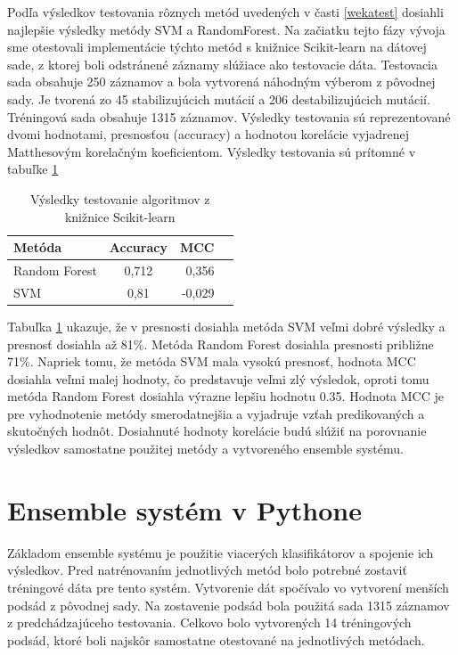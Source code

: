 Podľa výsledkov testovania rôznych metód uvedených v časti \ref{wekatest} dosiahli najlepšie výsledky metódy SVM a RandomForest. Na začiatku tejto fázy vývoja sme otestovali implementácie týchto metód s knižnice Scikit-learn na dátovej sade, z ktorej boli odstránené záznamy slúžiace ako testovacie dáta. Testovacia sada obsahuje 250 záznamov a bola vytvorená náhodným výberom z pôvodnej sady. Je tvorená zo 45 stabilizujúcich mutácií a 206 destabilizujúcich mutácií. Tréningová sada obsahuje 1315 záznamov. Výsledky testovania sú reprezentované dvomi hodnotami, presnosťou (accuracy) a hodnotou korelácie vyjadrenej Matthesovým korelačným koeficientom. Výsledky testovania sú prítomné v tabuľke \ref{scikittest}
\begin{table}[H]
	\centering
	\begin{tabular}{ | l | c | r | l| }
		\hline 
		Metóda  & Accuracy & MCC \\ \hline
		Random Forest & 0,712 & 0,356\\ \hline
		SVM & 0,81 & -0,029 \\\hline
	\end{tabular}
	\caption {Výsledky testovanie algoritmov z knižnice Scikit-learn} \label{scikittest} 
\end{table}

Tabuľka \ref{scikittest} ukazuje, že v presnosti dosiahla metóda SVM veľmi dobré výsledky a presnosť dosiahla až 81\%. Metóda Random Forest dosiahla presnosti približne 71\%. Napriek tomu, že metóda SVM mala vysokú presnosť, hodnota MCC dosiahla veľmi malej hodnoty, čo predstavuje veľmi zlý výsledok, oproti tomu metóda Random Forest dosiahla výrazne lepšiu hodnotu 0.35. Hodnota MCC je pre vyhodnotenie metódy smerodatnejšia a vyjadruje vzťah predikovaných a skutočných hodnôt. Dosiahnuté hodnoty korelácie budú slúžiť na porovnanie výsledkov samostatne použitej metódy a vytvoreného ensemble systému.

\section{Ensemble systém v Pythone}

Základom ensemble systému je použitie viacerých klasifikátorov a spojenie ich výsledkov. Pred natrénovaním jednotlivých metód bolo potrebné zostaviť tréningové dáta pre tento systém. Vytvorenie dát spočívalo vo vytvorení menších podsád z pôvodnej sady. Na zostavenie podsád bola použitá sada 1315 záznamov z predchádzajúceho testovania. Celkovo bolo vytvorených 14 tréningových podsád, ktoré boli najskôr samostatne otestované na jednotlivých metódach. 
  
